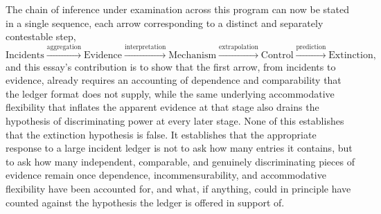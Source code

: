 \documentclass[11pt]{article}
\begin{document}
The chain of inference under examination across this program can now be stated in a single sequence, each arrow corresponding to a distinct and separately contestable step,
\[
\text{Incidents} \xrightarrow{\text{aggregation}} \text{Evidence} \xrightarrow{\text{interpretation}} \text{Mechanism} \xrightarrow{\text{extrapolation}} \text{Control} \xrightarrow{\text{prediction}} \text{Extinction},
\]
and this essay's contribution is to show that the first arrow, from incidents to evidence, already requires an accounting of dependence and comparability that the ledger format does not supply, while the same underlying accommodative flexibility that inflates the apparent evidence at that stage also drains the hypothesis of discriminating power at every later stage. None of this establishes that the extinction hypothesis is false. It establishes that the appropriate response to a large incident ledger is not to ask how many entries it contains, but to ask how many independent, comparable, and genuinely discriminating pieces of evidence remain once dependence, incommensurability, and accommodative flexibility have been accounted for, and what, if anything, could in principle have counted against the hypothesis the ledger is offered in support of.
\end{document}

